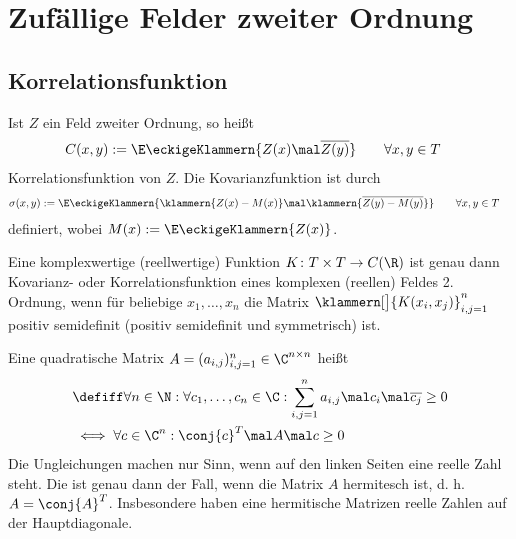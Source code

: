 
\chapter{Zufällige Felder zweiter Ordnung}
\section{Korrelationsfunktion}

\begin{erinnerungnr}\label{erinnerung3.1.1}
	Ist $Z$ ein Feld zweiter Ordnung, so heißt
	\begin{align*}
		C(x,y)
		&:=\E\eckigeKlammern{Z(x)\mal\overline{Z(y)}} \qquad\forall x,y\in T
	\end{align*}
	Korrelationsfunktion von $Z$. 
	Die Kovarianzfunktion ist durch 
	\begin{align*}
		\sigma(x,y)&:=\E\eckigeKlammern{\klammern{Z(x)-M(x)}\mal\klammern{\overline{Z(y)-M(y)}}}
		\qquad\forall x,y\in T
	\end{align*}
	definiert, wobei
	$M(x):=\E\eckigeKlammern{Z(x)}$.
\end{erinnerungnr}

\begin{satz}\label{satz3.1.2}
	Eine komplexwertige (reellwertige) Funktion $K\colon T\times T\to C(\R)$ ist genau dann Kovarianz- oder Korrelationsfunktion eines komplexen (reellen) Feldes 2. Ordnung, wenn für beliebige $x_1,\ldots,x_n$ die Matrix $\klammern[\big]{K(x_i,x_j)}_{i,j=1}^n$ positiv semidefinit (positiv semidefinit und symmetrisch) ist.
\end{satz}

\begin{erinnerung}
	 Eine quadratische Matrix $A=(a_{i,j})_{i,j=1}^n\in\C^{n\times n}$ heißt 
	 \begin{align*}
	 	&\defiff\forall n\in\N:\forall c_1,\ldots,c_n\in\C:\sum\limits_{i,j=1}^n a_{i,j}\mal c_i\mal\overline{c_j}\geq 0\\
	 	&\iff\forall c\in\C^n:\conj{c}^T\mal 
	 	A\mal c\geq 0
	 \end{align*}
	 Die Ungleichungen machen nur Sinn, wenn auf den linken Seiten eine reelle Zahl steht.
	 Die ist genau dann der Fall, wenn die Matrix $A$ hermitesch ist, d. h. $A=\conj{A}^T$.
	 Insbesondere haben eine hermitische Matrizen reelle Zahlen auf der Hauptdiagonale.
\end{erinnerung}

